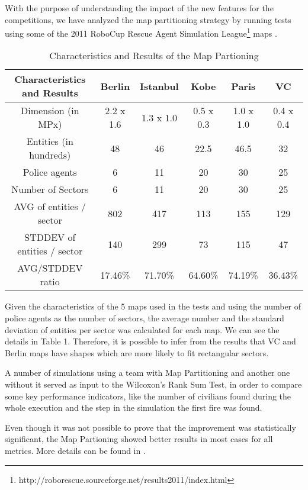 With the purpose of understanding the impact of the new features for the competitions, we have analyzed the map partitioning strategy by running tests using some of the 2011 RoboCup Rescue Agent Simulation League\footnote{http://roborescue.sourceforge.net/results2011/index.html} maps \cite{artigo-particionamento}.

\begin{table}\centering
	\label{tab:caracteristicas}
    \begin{tabular}{|c|c|c|c|c|c|}
	\hline
    Characteristics and Results			& Berlin    & Istanbul  & Kobe      & Paris     & VC        \\ \hline
    Dimension (in MPx)       			& 2.2 x 1.6 & 1.3 x 1.0 & 0.5 x 0.3 & 1.0 x 1.0 & 0.4 x 0.4 \\ \hline
    Entities (in hundreds)	 			& 48        & 46        & 22.5      & 46.5      & 32        \\ \hline
    Police agents              			& 6         & 11        & 20        & 30        & 25        \\ \hline
	Number of Sectors      				& 6         & 11        & 20        & 30        & 25        \\ \hline
	AVG of entities / sector			& 802       & 417       & 113       & 155       & 129       \\ \hline
	STDDEV of entities / sector			& 140       & 299       & 73        & 115       & 47        \\ \hline
	AVG/STDDEV ratio					& 17.46\%   & 71.70\%   & 64.60\%   & 74.19\%   & 36.43\%   \\ \hline
    \end{tabular}
    \caption {Characteristics and Results of the Map Partioning}
\end{table}

Given the characteristics of the 5 maps used in the tests and using the number of police agents as the number of sectors, the average number and the standard deviation of entities per sector was calculated for each map. We can see the details in Table 1. Therefore, it is possible to infer from the results that VC and Berlin maps have shapes which are more likely to fit rectangular sectors.

A number of simulations using a team with Map Partitioning and another one without it served as input to the Wilcoxon’s Rank Sum Test, in order to compare some key performance indicators, like the number of civilians found during the whole execution and the step in the simulation the first fire was found.

Even though it was not possible to prove that the improvement was statistically significant, the Map Partioning showed better results in most cases for all metrics. More details can be found in \cite{artigo-particionamento}.
